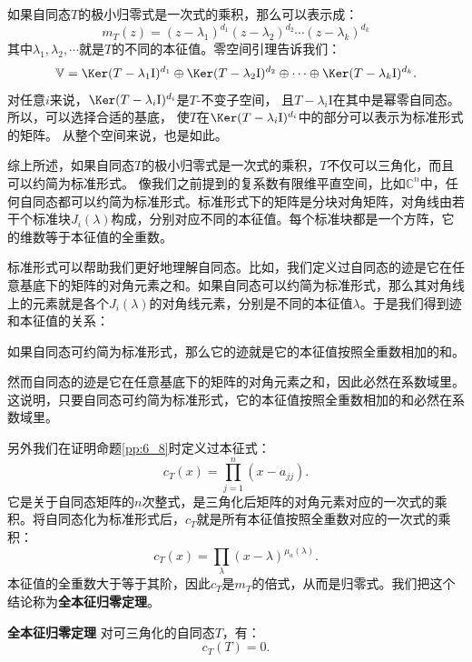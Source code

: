 \documentclass[12pt,UTF8]{ctexbook}
\begin{document}
如果自同态$T$的极小归零式是一次式的乘积，那么可以表示成：
$$ m_T(z) = (z - \lambda_1)^{d_1} (z - \lambda_2)^{d_2} \cdots  (z - \lambda_k)^{d_k}$$
其中$\lambda_1, \lambda_2,\cdots$就是$T$的不同的本征值。零空间引理告诉我们：
$$ \mathbb{V} = \Ker (T - \lambda_1\mathrm{I})^{d_1} \oplus \Ker (T - \lambda_2\mathrm{I})^{d_2} \oplus \cdots \oplus \Ker (T - \lambda_k\mathrm{I})^{d_k}.$$
对任意$i$来说，$\Ker (T - \lambda_i\mathrm{I})^{d_i}$是$T$-不变子空间，
且$T - \lambda_i\mathrm{I}$在其中是幂零自同态。所以，可以选择合适的基底，
使$T$在$\Ker (T - \lambda_i\mathrm{I})^{d_i}$中的部分可以表示为标准形式的矩阵。
从整个空间来说，也是如此。

综上所述，如果自同态$T$的极小归零式是一次式的乘积，$T$不仅可以三角化，而且可以约简为标准形式。
像我们之前提到的复系数有限维平直空间，比如$\mathbb{C}^n$中，任何自同态都可以约简为标准形式。标准形式下的矩阵是分块对角矩阵，对角线由若干个标准块$J_i(\lambda)$构成，分别对应不同的本征值。每个标准块都是一个方阵，它的维数等于本征值的全重数。

标准形式可以帮助我们更好地理解自同态。比如，我们定义过自同态的迹是它在任意基底下的矩阵的对角元素之和。如果自同态可以约简为标准形式，那么其对角线上的元素就是各个$J_i(\lambda)$的对角线元素，分别是不同的本征值$\lambda$。于是我们得到迹和本征值的关系：
\begin{tm}
    如果自同态可约简为标准形式，那么它的迹就是它的本征值按照全重数相加的和。
\end{tm}
然而自同态的迹是它在任意基底下的矩阵的对角元素之和，因此必然在系数域里。这说明，只要自同态可约简为标准形式，它的本征值按照全重数相加的和必然在系数域里。

另外我们在证明命题\ref{pp:6_8}时定义过本征式：
$$
c_T(x) = \prod_{j=1}^n(x - a_{jj}).
$$
它是关于自同态矩阵的$n$次整式，是三角化后矩阵的对角元素对应的一次式的乘积。将自同态化为标准形式后，$c_T$就是所有本征值按照全重数对应的一次式的乘积：
$$
c_T(x) = \prod_{\lambda}(x - \lambda)^{\mu_{a}(\lambda)}.
$$
本征值的全重数大于等于其阶，因此$c_T$是$m_T$的倍式，从而是归零式。我们把这个结论称为\textbf{全本征归零定理}。
\begin{tm}{\textbf{全本征归零定理}}
    对可三角化的自同态$T$，有：
    $$ c_T(T) = 0. $$
\end{tm}
\end{document}
